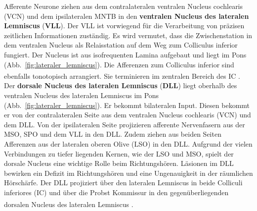 \documentclass[12pt,a4paper,pdftex]{article}
\begin{document}
Afferente Neurone ziehen aus dem contralateralen ventralen Nucleus cochlearis (VCN) und dem ipsilateralen MNTB in den \textbf{ventralen Nucleus des lateralen Lemniscus} (\textbf{VLL}). Der VLL ist vorwiegend für die Verarbeitung von präzisen zeitlichen Informationen zuständig.
Es wird vermutet, dass die Zwischenstation in dem ventralen Nucleus als Relaisstation auf dem Weg zum Colliculus inferior fungiert.
Der Nucleus ist aus isofrequenten Lamina aufgebaut und liegt im Pons (Abb.~\ref{fig:lateraler_lemniscus}). Die Afferenzen zum Colliculus inferior sind ebenfalls tonotopisch arrangiert. Sie terminieren im zentralen Bereich des IC \textsuperscript{\cite[29]{paxinos2014rat}}.
\\

Der \textbf{dorsale Nucleus des lateralen Lemniscus} (\textbf{DLL}) liegt oberhalb des ventralen Nucleus des lateralen Lemniscus im Pons (Abb.~\ref{fig:lateraler_lemniscus}). Er bekommt bilateralen Input. Diesen bekommt er von der contralateralen Seite aus dem ventralen Nucleus cochlearis (VCN) und dem DLL. Von der ipsilateralen Seite projizieren afferente Nervenfasern aus der MSO, SPO und dem VLL in den DLL. Zudem ziehen aus beiden Seiten Afferenzen aus der lateralen oberen Olive (LSO) in den DLL.
Aufgrund der vielen Verbindungen zu tiefer liegenden Kernen, wie der LSO und MSO, spielt der dorsale Nucleus eine wichtige Rolle beim Richtungshören. Läsionen im DLL bewirken ein Defizit im Richtungshören und eine Ungenauigkeit in der räumlichen Hörschärfe. 
Der DLL projiziert über den lateralen Lemniscus in beide Colliculi inferiores (IC) und über die Probst Kommissur in den gegenüberliegenden dorsalen Nucleus des lateralen Lemniscus
\textsuperscript{\cite[29]{paxinos2014rat}}.
\end{document}
